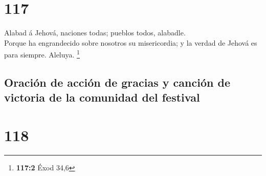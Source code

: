 \hypertarget{section-116}{%
\section{117}\label{section-116}}

 Alabad á Jehová, naciones todas; pueblos todos,
alabadle.\\
 Porque ha engrandecido sobre nosotros su misericordia; y
la verdad de Jehová es para siempre. Aleluya. \footnote{\textbf{117:2}
  Éxod 34,6}

\hypertarget{oraciuxf3n-de-acciuxf3n-de-gracias-y-canciuxf3n-de-victoria-de-la-comunidad-del-festival}{%
\subsection{Oración de acción de gracias y canción de victoria de la
comunidad del
festival}\label{oraciuxf3n-de-acciuxf3n-de-gracias-y-canciuxf3n-de-victoria-de-la-comunidad-del-festival}}

\hypertarget{section-117}{%
\section{118}\label{section-117}}

